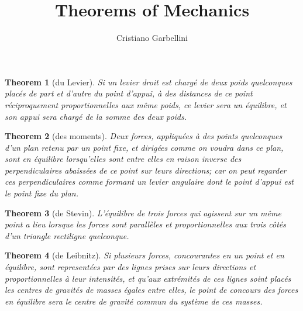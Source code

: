 \documentclass[a4paper,11pt]{article}
\author{Cristiano Garbellini}
\title{Theorems of Mechanics}
\theoremstyle{plain}
\newtheorem{theorem}{Theorem}
\begin{document}
\maketitle

\begin{theorem}[du Levier]	
Si un levier droit est chargé de deux poids quelconques placés de part et d'autre du point
d'appui, à des distances de ce point réciproquement proportionnelles aux même poids,
ce levier sera un équilibre, et son appui sera chargé de la somme des deux poids.
\end{theorem}

\begin{theorem}[des moments]
Deux forces, appliquées à des points quelconques d'un plan retenu par un point fixe, et
dirigées comme on voudra dans ce plan, sont en équilibre lorsqu'elles sont entre elles
en raison inverse des perpendiculaires abaissées de ce point sur leurs directions; car
on peut regarder ces perpendiculaires comme formant un levier angulaire dont le point
d'appui est le point fixe du plan.
\end{theorem}

\begin{theorem}[de Stevin]
L'équilibre de trois forces qui agissent sur un même point a lieu lorsque les forces sont
parallèles et proportionnelles aux trois côtés d'un triangle rectiligne quelconque.
\end{theorem}

\begin{theorem}[de Leibnitz]
Si plusieurs forces, concourantes en un point et en équilibre, sont representées par des
lignes prises sur leurs directions et proportionnelles à leur intensités, et qu'aux extrémités
de ces lignes soint placés les centres de gravités de masses égales entre elles, le point de
concours des forces en équilibre sera le centre de gravité commun du système de ces
masses.
\end{theorem}
\end{document}
